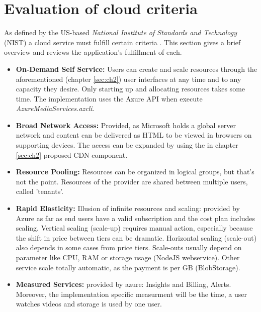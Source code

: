 \section{Evaluation of cloud criteria}\label{sec:ch4}
As defined by the US-based \textit{National Institute of Standards and Technology} (NIST) a cloud service must fulfill certain criteria \cite{nistCloud}. This section gives a brief overview and reviews the application's fulfillment of each.
\begin{itemize}
    \item \textbf{On-Demand Self Service:} Users can create and scale resources through the aforementioned (chapter \ref{sec:ch2}) user interfaces at any time and to any capacity they desire. Only starting up and allocating resources takes some time. The implementation uses the Azure API when execute \textit{AzureMediaServices.azcli}.
    \item \textbf{Broad Network Access:} Provided, as Microsoft holds a global server network and content can be delivered as HTML to be viewed in browsers on supporting devices. The access can be expanded by using the in chapter \ref{sec:ch2} proposed CDN component.
    \item \textbf{Resource Pooling:} Resources can be organized in logical groups, but that's not the point. Resources of the provider are shared between multiple users, called 'tenants'. 
    \item \textbf{Rapid Elasticity:} Illusion of infinite resources and scaling: provided by Azure as far as end users have a valid subscription and the cost plan includes scaling. Vertical scaling (scale-up) requires manual action, especially because the shift in price between tiers can be dramatic. Horizontal scaling (scale-out) also depends in some cases from price tiers. Scale-outs usually depend on parameter like CPU, RAM or storage usage (NodeJS webservice). Other service scale totally automatic, as the payment is per GB (BlobStorage).
    \item \textbf{Measured Services:} provided by azure: Insights and Billing, Alerts. Moreover, the implementation specific measurment will be the time, a user watches videos and storage is used by one user.
\end{itemize}
